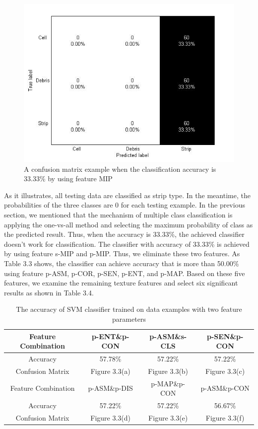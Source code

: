 \begin{figure}[!h]
\includegraphics[width=\linewidth]{confusion_matrix/fig3_2}
\caption{A confusion matrix example when the classification accuracy is 33.33\% by using feature MIP}
\end{figure}
As it illustrates, all testing data are classified as strip type. In the meantime, the probabilities of the three classes are 0 for each testing example. In the previous section, we mentioned that the mechanism of multiple class classification is applying the one-vs-all method and selecting the maximum probability of class as the predicted result. Thus, when the accuracy is 33.33\%, the achieved classifier doesn't work for classification. The classifier with accuracy of 33.33\% is achieved by using feature s-MIP and p-MIP. Thus, we eliminate these two features. As Table 3.3 shows, the classifier can achieve accuracy that is more than 50.00\% using feature p-ASM, p-COR, p-SEN, p-ENT, and p-MAP. Based on these five features, we examine the remaining texture features and select six significant results as shown in Table 3.4.   
\begin{table}[!h]
\begin{center}
\renewcommand{\arraystretch}{0.5}
\begin{tabular}{|| c | c c c ||}
\hline
 Feature Combination& p-ENT\&p-CON & p-ASM\&s-CLS & p-SEN\&p-CON \\
 \hline
 Accuracy & 57.78\% & 57.22\% & 57.22\% \\
 \hline
 Confusion Matrix & Figure 3.3(a) & Figure 3.3(b) & Figure 3.3(c) \\
 \hline
 \hline
 Feature Combination& p-ASM\&p-DIS & p-MAP\&p-CON & p-ASM\&p-CON \\
 \hline
 Accuracy & 57.22\% & 57.22\% & 56.67\% \\
 \hline
 Confusion Matrix & Figure 3.3(d) & Figure 3.3(e) & Figure 3.3(f) \\
 \hline
\end{tabular}
\end{center}
\caption{The accuracy of SVM classifier trained on data examples with two feature parameters}
\end{table}
